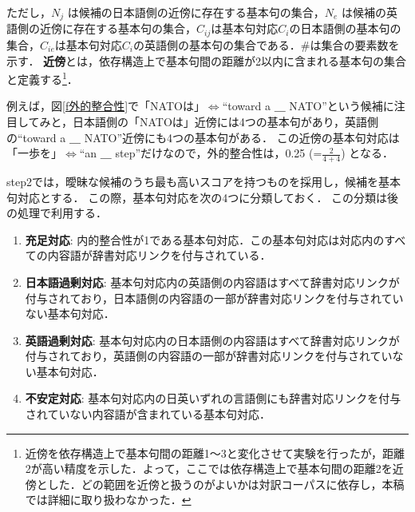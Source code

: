 ただし，$N_j$ は候補の日本語側の近傍に存在する基本句の集合，$N_e$ は候補の英語側の近傍に存在する基本句の集合，$C_{ij}$は基本句対応$C_i$の日本語側の基本句の集合，$C_{ie}$は基本句対応$C_i$の英語側の基本句の集合である．\#は集合の要素数を示す．
{\bf 近傍}とは，依存構造上で基本句間の距離が2以内に含まれる基本句の集合と定義する\footnote{近傍を依存構造上で基本句間の距離1〜3と変化させて実験を行ったが，距離2が高い精度を示した．よって，ここでは依存構造上で基本句間の距離2を近傍とした．どの範囲を近傍と扱うのがよいかは対訳コーパスに依存し，本稿では詳細に取り扱わなかった．}．





例えば，図\ref{f外的整合性}で「NATOは」$\Leftrightarrow$``toward a ＿ NATO''という候補に注目してみと，日本語側の「NATOは」近傍には4つの基本句があり，英語側の``toward a ＿ NATO''近傍にも4つの基本句がある．
この近傍の基本句対応は「一歩を」$\Leftrightarrow$``an ＿ step''だけなので，外的整合性は，0.25 (=$\frac{2}{4+4}$) となる．



\vspace{1ex}
\vspace{1ex}
\vspace{1ex}
\vspace{1ex}


step2では，曖昧な候補のうち最も高いスコアを持つものを採用し，候補を基本句対応とする．
この際，基本句対応を次の4つに分類しておく．
この分類は後の処理で利用する．

\vspace{1ex}
\begin{enumerate}
	\item {\bf 充足対応}: 内的整合性が1である基本句対応．この基本句対応は対応内のすべての内容語が辞書対応リンクを付与されている．
	\item {\bf 日本語過剰対応}: 基本句対応内の英語側の内容語はすべて辞書対応リンクが付与されており，日本語側の内容語の一部が辞書対応リンクを付与されていない基本句対応．
	\item {\bf 英語過剰対応}: 基本句対応内の日本語側の内容語はすべて辞書対応リンクが付与されており，英語側の内容語の一部が辞書対応リンクを付与されていない基本句対応．
	\item {\bf 不安定対応}: 基本句対応内の日英いずれの言語側にも辞書対応リンクを付与されていない内容語が含まれている基本句対応．
\end{enumerate}
\vspace{1ex}



